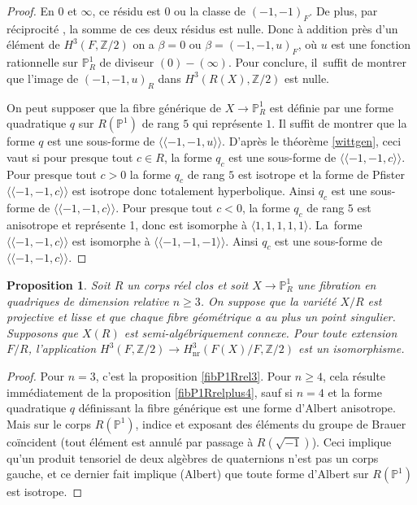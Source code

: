 \documentclass[11pt]{article}
\newtheorem{prop}[thm]{Proposition}
\theoremstyle{definition}
\newcommand{\Z}{\mathbb Z}
\renewcommand{\P}{\mathbb P}
\newcommand{\on}[1]{\operatorname{#1}}
\begin{document}
\begin{proof}
En $0$ et $\infty$, ce résidu est $0$ ou la classe de $(-1,-1)_{F}$.
De plus, par réciprocité \cite[Prop.\,2.2]{rost1996chow}, la somme de ces deux résidus est nulle. Donc
à addition près d'un élément de $H^3(F,\Z/2)$ on a
$\beta=0$ ou $\beta=(-1,-1,u)_{F}$, où $u$ est une fonction rationnelle sur $\P^1_{R}$
de diviseur $(0)-(\infty)$. Pour conclure, il~suffit de montrer que l'image de $(-1,-1,u)_{R}$ dans $H^3(R(X), \Z/2)$ est nulle.

On peut supposer que la fibre générique de $X\to \P^1_R$ est définie par une forme quadratique $q$ sur $R(\P^1)$ de rang $5$ qui représente $1$.
Il suffit de montrer que la forme $q$ est une sous-forme de $\langle \!\langle -1,-1,u\rangle \!\rangle$.
D'après le théorème \ref{wittgen}, ceci vaut si pour presque tout $c\in R$,
la forme $q_{c}$ est une sous-forme de $\langle \!\langle -1,-1,c\rangle \!\rangle$.
Pour presque tout $c>0$ la forme $q_{c}$ de rang $5$ est isotrope et la forme de Pfister $\langle \!\langle-1,-1,c\rangle \!\rangle$ est isotrope donc
totalement hyperbolique. Ainsi $q_{c}$ est une sous-forme de $\langle \!\langle-1,-1,c\rangle \!\rangle$.
Pour presque tout $c<0$, la forme $q_{c}$ de rang $5$ est anisotrope et représente 1, donc
est isomorphe à $ \langle 1,1,1,1,1\rangle $. La~forme $\langle \!\langle-1,-1,c\rangle \!\rangle$ est isomorphe
à $\langle \!\langle-1,-1,-1\rangle \!\rangle$. Ainsi $q_{c}$ est une sous-forme de $\langle \!\langle-1,-1,c\rangle \!\rangle$.
\end{proof}

\begin{prop}\label{fibquaRconnexenqeq3}
Soit $R$ un corps réel clos et soit $X\to \P^1_{R}$ une fibration en quadriques de dimension relative $ n \geq 3$.
On suppose que la variété $X/R$ est projective et lisse
et que chaque fibre géométrique a au plus un point singulier.
Supposons que $X(R)$ est semi-algébriquement connexe.
Pour toute extension $F/R$, l'application $H^3(F,\Z/2) \to H^3_{\on{nr}}(F(X)/F, \Z/2)$ est
un isomorphisme.
\end{prop}
\begin{proof}
Pour $n=3$, c'est la proposition \ref{fibP1Rrel3}. Pour $n\geq 4$,
cela résulte immédiatement de la proposition \ref{fibP1Rrelplus4}, sauf si
$n=4$ et la forme quadratique $q$ définissant la fibre générique
est une forme d'Albert anisotrope. Mais sur le corps $R(\P^1)$,
indice et exposant des éléments du groupe de Brauer coïncident
(tout élément est annulé par passage à $R(\sqrt{-1})$). Ceci implique
qu'un produit tensoriel de deux algèbres de quaternions n'est pas un corps
gauche, et ce dernier fait implique (Albert) que toute forme d'Albert sur $R(\P^1)$ est isotrope.
\end{proof}
\end{document}
